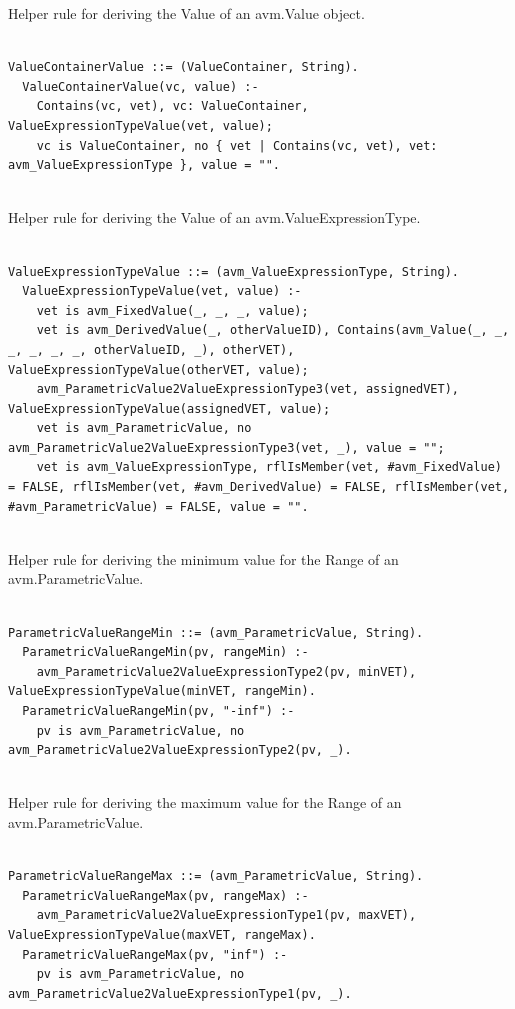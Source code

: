 Helper rule for deriving the Value of an avm.Value object.
\begin{lstlisting}

ValueContainerValue ::= (ValueContainer, String).
  ValueContainerValue(vc, value) :-
    Contains(vc, vet), vc: ValueContainer, ValueExpressionTypeValue(vet, value);
    vc is ValueContainer, no { vet | Contains(vc, vet), vet: avm_ValueExpressionType }, value = "".


\end{lstlisting}

Helper rule for deriving the Value of an avm.ValueExpressionType.
\begin{lstlisting}

ValueExpressionTypeValue ::= (avm_ValueExpressionType, String).
  ValueExpressionTypeValue(vet, value) :-
    vet is avm_FixedValue(_, _, _, value);
    vet is avm_DerivedValue(_, otherValueID), Contains(avm_Value(_, _, _, _, _, _, otherValueID, _), otherVET), ValueExpressionTypeValue(otherVET, value);
    avm_ParametricValue2ValueExpressionType3(vet, assignedVET), ValueExpressionTypeValue(assignedVET, value);
    vet is avm_ParametricValue, no avm_ParametricValue2ValueExpressionType3(vet, _), value = "";
    vet is avm_ValueExpressionType, rflIsMember(vet, #avm_FixedValue) = FALSE, rflIsMember(vet, #avm_DerivedValue) = FALSE, rflIsMember(vet, #avm_ParametricValue) = FALSE, value = "".


\end{lstlisting}

Helper rule for deriving the minimum value for the Range of an avm.ParametricValue.
\begin{lstlisting}

ParametricValueRangeMin ::= (avm_ParametricValue, String).
  ParametricValueRangeMin(pv, rangeMin) :-
    avm_ParametricValue2ValueExpressionType2(pv, minVET), ValueExpressionTypeValue(minVET, rangeMin).
  ParametricValueRangeMin(pv, "-inf") :-
    pv is avm_ParametricValue, no avm_ParametricValue2ValueExpressionType2(pv, _).


\end{lstlisting}

Helper rule for deriving the maximum value for the Range of an avm.ParametricValue.
\begin{lstlisting}

ParametricValueRangeMax ::= (avm_ParametricValue, String).
  ParametricValueRangeMax(pv, rangeMax) :-
    avm_ParametricValue2ValueExpressionType1(pv, maxVET), ValueExpressionTypeValue(maxVET, rangeMax).
  ParametricValueRangeMax(pv, "inf") :-
    pv is avm_ParametricValue, no avm_ParametricValue2ValueExpressionType1(pv, _).


\end{lstlisting}


